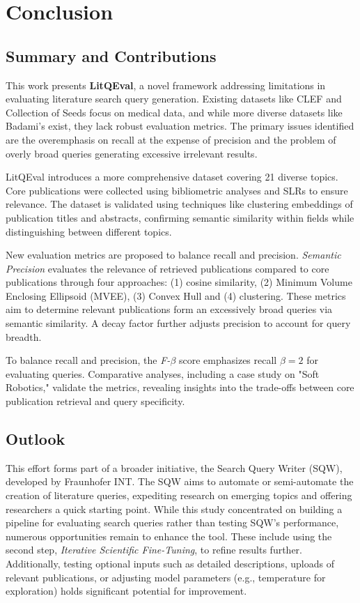 \chapter{Conclusion}\label{ch:conclusion}

\section{Summary and Contributions}
This work presents \textbf{LitQEval}, a novel framework addressing limitations in evaluating literature search query generation. Existing datasets like CLEF and Collection of Seeds focus on medical data, and while more diverse datasets like Badami’s \autocite{badami2023adaptive} exist, they lack robust evaluation metrics. The primary issues identified are the overemphasis on recall at the expense of precision and the problem of overly broad queries generating excessive irrelevant results. 

LitQEval introduces a more comprehensive dataset covering 21 diverse topics. Core publications were collected using bibliometric analyses and SLRs to ensure relevance. The dataset is validated using techniques like clustering embeddings of publication titles and abstracts, confirming semantic similarity within fields while distinguishing between different topics.

New evaluation metrics are proposed to balance recall and precision. \textit{Semantic Precision} evaluates the relevance of retrieved publications compared to core publications through four approaches: (1) cosine similarity, (2) Minimum Volume Enclosing Ellipsoid (MVEE), (3) Convex Hull and (4) clustering. These metrics aim to determine relevant publications form an excessively broad queries via semantic similarity. A decay factor further adjusts precision to account for query breadth.

To balance recall and precision, the \textit{ F-$\beta$ }score emphasizes recall $\beta=2$ for evaluating queries. Comparative analyses, including a case study on "Soft Robotics," validate the metrics, revealing insights into the trade-offs between core publication retrieval and query specificity.

\section{Outlook}
This effort forms part of a broader initiative, the Search Query Writer (SQW), developed by Fraunhofer INT. The SQW aims to automate or semi-automate the creation of literature queries, expediting research on emerging topics and offering researchers a quick starting point. While this study concentrated on building a pipeline for evaluating search queries rather than testing SQW's performance, numerous opportunities remain to enhance the tool. These include using the second step, \textit{Iterative Scientific Fine-Tuning}, to refine results further. Additionally, testing optional inputs such as detailed descriptions, uploads of relevant publications, or adjusting model parameters (e.g., temperature for exploration) holds significant potential for improvement.

